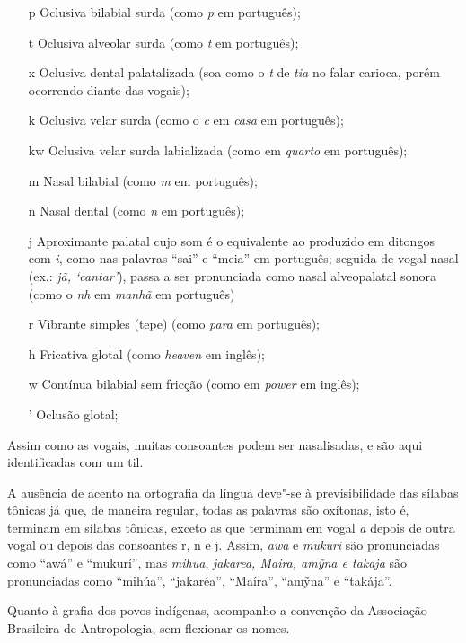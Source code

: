 \begin{itemize}
\item[p] Oclusiva bilabial surda (como \emph{p} em português);

\item[t] Oclusiva alveolar surda (como \emph{t} em português);

\item[x] Oclusiva dental palatalizada (soa como o \emph{t} de \emph{tia} no falar carioca, porém ocorrendo diante das vogais);

\item[k] Oclusiva velar surda (como o \emph{c} em \emph{casa} em português);

\item[kw] Oclusiva velar surda labializada (como em \emph{quarto} em português);

\item[m] Nasal bilabial (como \emph{m} em português);

\item[n] Nasal dental (como \emph{n} em português);

\item[j] Aproximante palatal cujo som é o equivalente ao produzido em ditongos com \emph{i}, como nas palavras ``sai'' e ``meia'' em português; seguida de vogal nasal (ex.: \emph{jã, `cantar'}), passa a ser pronunciada como nasal alveopalatal sonora (como o \emph{nh} em \emph{manhã} em português)

\item[r] Vibrante simples (tepe) (como \emph{para} em português);

\item[h] Fricativa glotal (como \emph{heaven} em inglês);

\item[w] Contínua bilabial sem fricção (como em \emph{power} em inglês);

\item['] Oclusão glotal;
\end{itemize}

Assim como as vogais, muitas consoantes podem ser nasalisadas, e são
aqui identificadas com um til.

A ausência de acento na ortografia da língua deve"-se à previsibilidade
das sílabas tônicas já que, de maneira regular, todas as palavras são
oxítonas, isto é, terminam em sílabas tônicas, exceto as que terminam em
vogal \emph{a} depois de outra vogal ou depois das consoantes r, n e j.
Assim, \emph{awa} e \emph{mukuri} são pronunciadas como ``awá'' e
``mukurí'', mas \emph{mihua}, \emph{jakarea, Maira, amỹna e takaja} são
pronunciadas como ``mihúa'', ``jakaréa'', ``Maíra'', ``amỹna'' e
``takája''.

Quanto à grafia dos povos indígenas, acompanho a convenção da Associação
Brasileira de Antropologia, sem flexionar os nomes.


